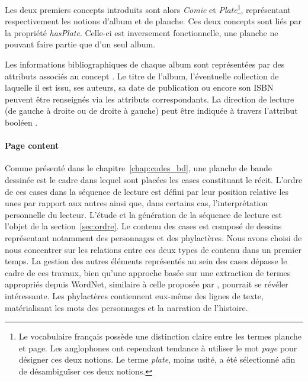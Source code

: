 Les deux premiers concepts introduits sont alors \textit{Comic} et \textit{Plate}\footnote{Le vocabulaire français possède une distinction claire entre les termes planche et page. Les anglophones ont cependant tendance à utiliser le mot \emph{page} pour désigner ces deux notions. Le terme \emph{plate}, moins usité, a été sélectionné afin de désambiguïser ces deux notions.}, représentant respectivement les notions d'album et de planche.
Ces deux concepts sont liés par la propriété \textit{hasPlate}.
Celle-ci est inversement fonctionnelle, une planche ne pouvant faire partie que d'un seul album.

Les informations bibliographiques de chaque album sont représentées par des attributs associés au concept .
Le titre de l'album, l'éventuelle collection de laquelle il est issu, ses auteurs, sa date de publication ou encore son ISBN peuvent être renseignés via les attributs correspondants.
La direction de lecture (de gauche à droite ou de droite à gauche) peut être indiquée à travers l'attribut booléen .



\paragraph{Page content} %
\label{par:page_content}
Comme présenté dans le chapitre~\ref{chap:codes_bd}, une planche de bande dessinée est le cadre dans lequel sont placées les cases constituant le récit.
L'ordre de ces cases dans la séquence de lecture est défini par leur position relative les unes par rapport aux autres ainsi que, dans certains cas, l'interprétation personnelle du lecteur.
L'étude et la génération de la séquence de lecture est l'objet de la section~\ref{sec:ordre}.
Le contenu des cases est composé de dessins représentant notamment des personnages et des phylactères.
Nous avons choisi de nous concentrer sur les relations entre ces deux types de contenu dans un premier temps.
La gestion des autres éléments représentés au sein des cases dépasse le cadre de ces travaux, bien qu'une approche basée sur une extraction de termes appropriés depuis WordNet, similaire à celle proposée par \cite{Zinger2005}, pourrait se révéler intéressante.
Les phylactères contiennent eux-même des lignes de texte, matérialisant les mots des personnages et la narration de l'histoire.\\


